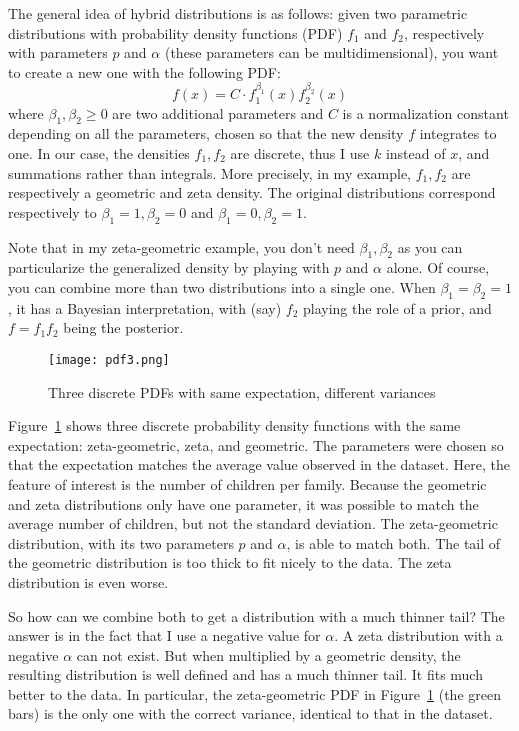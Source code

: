 \documentclass[oneside,10pt]{book}
\begin{document}
The general idea of \textcolor{index}{hybrid distributions} is as follows: given two parametric distributions with probability density functions (PDF) $f_1$ and $f_2$, respectively with parameters $p$ and $\alpha$ (these parameters can be multidimensional), you want to create a new one with the following PDF:
$$
f(x) = C\cdot f_1^{\beta_1} (x) f_2^{\beta_2}(x)
$$
where $\beta_1, \beta_2\geq 0$ are two additional parameters and $C$ is a normalization constant depending on all the parameters, chosen so that the new density $f$ integrates to one. In our case, the densities $f_1, f_2$ are discrete, thus I use $k$ instead of $x$, and summations rather than integrals. More
 precisely, in my example, $f_1, f_2$ are respectively a geometric and zeta density. The original distributions correspond
 respectively to $\beta_1 = 1, \beta_2=0$ and $\beta_1 = 0, \beta_2=1$.

Note that in my zeta-geometric example, you don't need $\beta_1, \beta_2$ as you can particularize the generalized density by playing with $p$ and $\alpha$ alone. Of course, you can combine more than two distributions into a single one.  When $\beta_1=\beta_2=1$, it has a Bayesian interpretation, with (say) $f_2$ playing the role of a prior, and $f=f_1 f_2$ being the posterior.

\begin{figure}[H]
\centering
\texttt{[image: pdf3.png]}
\caption{Three discrete PDFs with same expectation, different variances}
\label{fig:prqerw75}
\end{figure}


Figure~\ref{fig:prqerw75} shows three discrete probability density functions with the same expectation: zeta-geometric, zeta, and geometric.
 The parameters were chosen so that the expectation matches the average value observed in the dataset. Here, the feature
of interest is the number of children per family.
Because the geometric and zeta distributions only have one parameter, it was possible to match the average number of children, but not the standard deviation. The zeta-geometric distribution, with its two
parameters $p$ and $\alpha$, is able to match both. The tail of the geometric distribution is too thick to fit nicely to the data. The zeta
 distribution is even worse.

So how can we combine both to get a distribution with a much thinner tail? The answer is in the fact that
 I use a negative value for $\alpha$. A zeta distribution with a negative $\alpha$ can not exist. But when multiplied by a geometric density,
 the resulting distribution is well defined and has a much thinner tail. It fits much better to the data. In particular, the zeta-geometric PDF
 in Figure~\ref{fig:prqerw75} (the green bars) is the only one with the correct variance, identical to that in the dataset.
\end{document}
